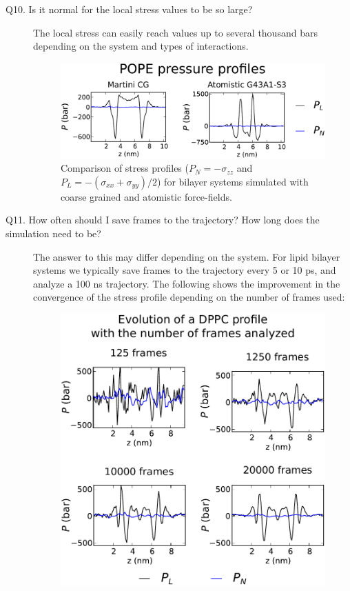 \documentclass[10pt,letterpaper,notitlepage]{article}
\begin{document}
\begin{description}
\item[Q10. Is it normal for the local stress values to be so large?] The local stress can easily reach values up to several thousand bars depending on the system and types of interactions.

\begin{figure}[!ht]
\centering
\includegraphics[width=5.5in]{figs/tot.pdf}
\caption{Comparison of stress profiles ($P_N = -\sigma_{zz}$ and $P_L = -(\sigma_{xx} + \sigma_{yy})/2$) for bilayer systems simulated with coarse grained and atomistic force-fields.}
\end{figure}

\item[Q11. How often should I save frames to the trajectory? How long does the simulation need to be?] The answer to this may differ depending on the system. For lipid bilayer systems we typically save frames to the trajectory every 5 or 10 ps, and analyze a 100 ns trajectory. The following shows the improvement in the convergence of the stress profile depending on the number of frames used:

 \begin{figure}[!ht]
 \centering
 \includegraphics[width=4in]{figs/evol.pdf}
 \caption{}
 \end{figure}


\end{description}
\end{document}
